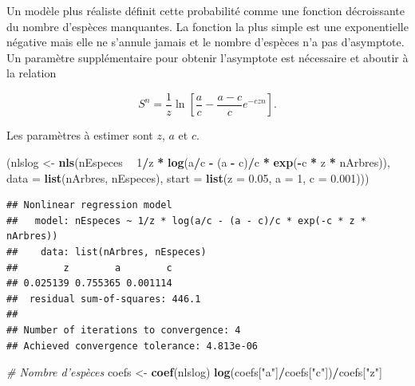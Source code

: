 \documentclass[
  11pt,
  french,
  a4paper,
  extrafontsizes,onecolumn,openright
  ]{memoir}
\newenvironment{Shaded}{\begin{snugshade}}{\end{snugshade}}
\newcommand{\CommentTok}[1]{\textcolor[rgb]{0.56,0.35,0.01}{\textit{#1}}}
\newcommand{\DataTypeTok}[1]{\textcolor[rgb]{0.13,0.29,0.53}{#1}}
\newcommand{\DecValTok}[1]{\textcolor[rgb]{0.00,0.00,0.81}{#1}}
\newcommand{\FloatTok}[1]{\textcolor[rgb]{0.00,0.00,0.81}{#1}}
\newcommand{\KeywordTok}[1]{\textcolor[rgb]{0.13,0.29,0.53}{\textbf{#1}}}
\newcommand{\NormalTok}[1]{#1}
\newcommand{\OperatorTok}[1]{\textcolor[rgb]{0.81,0.36,0.00}{\textbf{#1}}}
\newcommand{\StringTok}[1]{\textcolor[rgb]{0.31,0.60,0.02}{#1}}
\begin{document}
Un modèle plus réaliste définit cette probabilité comme une fonction décroissante du nombre d'espèces manquantes.
La fonction la plus simple est une exponentielle négative mais elle ne s'annule jamais et le nombre d'espèces n'a pas d'asymptote.
Un paramètre supplémentaire pour obtenir l'asymptote est nécessaire et aboutir à la relation

\begin{equation} 
  \label{eq:Soberon1993b}
  S^{n} = \frac{1}{z} \ln \left[ \frac{a}{c} - \frac{a-c}{c} e^{-czn} \right].
\end{equation}

Les paramètres à estimer sont \(z\), \(a\) et \(c\).

\scriptsize

\begin{Shaded}
\begin{Highlighting}[]
\NormalTok{(nlslog <-}\StringTok{ }\KeywordTok{nls}\NormalTok{(nEspeces }\OperatorTok{~}\StringTok{ }\DecValTok{1}\OperatorTok{/}\NormalTok{z }\OperatorTok{*}\StringTok{ }\KeywordTok{log}\NormalTok{(a}\OperatorTok{/}\NormalTok{c }\OperatorTok{-}\StringTok{ }\NormalTok{(a }\OperatorTok{-}\StringTok{ }\NormalTok{c)}\OperatorTok{/}\NormalTok{c }\OperatorTok{*}\StringTok{ }\KeywordTok{exp}\NormalTok{(}\OperatorTok{-}\NormalTok{c }\OperatorTok{*}
\StringTok{    }\NormalTok{z }\OperatorTok{*}\StringTok{ }\NormalTok{nArbres)), }\DataTypeTok{data =} \KeywordTok{list}\NormalTok{(nArbres, nEspeces), }\DataTypeTok{start =} \KeywordTok{list}\NormalTok{(}\DataTypeTok{z =} \FloatTok{0.05}\NormalTok{,}
    \DataTypeTok{a =} \DecValTok{1}\NormalTok{, }\DataTypeTok{c =} \FloatTok{0.001}\NormalTok{)))}
\end{Highlighting}
\end{Shaded}

\begin{verbatim}
## Nonlinear regression model
##   model: nEspeces ~ 1/z * log(a/c - (a - c)/c * exp(-c * z * nArbres))
##    data: list(nArbres, nEspeces)
##        z        a        c 
## 0.025139 0.755365 0.001114 
##  residual sum-of-squares: 446.1
## 
## Number of iterations to convergence: 4 
## Achieved convergence tolerance: 4.813e-06
\end{verbatim}

\begin{Shaded}
\begin{Highlighting}[]
\CommentTok{# Nombre d'espèces}
\NormalTok{coefs <-}\StringTok{ }\KeywordTok{coef}\NormalTok{(nlslog)}
\KeywordTok{log}\NormalTok{(coefs[}\StringTok{"a"}\NormalTok{]}\OperatorTok{/}\NormalTok{coefs[}\StringTok{"c"}\NormalTok{])}\OperatorTok{/}\NormalTok{coefs[}\StringTok{"z"}\NormalTok{]}
\end{Highlighting}
\end{Shaded}
\end{document}
